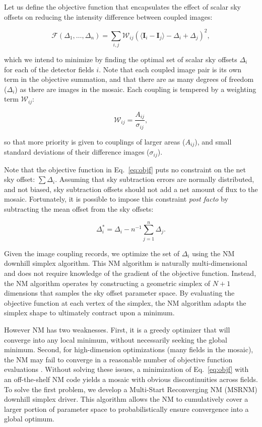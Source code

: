 \documentclass[iop]{emulateapj}
\newcommand{\vect}[1]{\boldsymbol{#1}} %
\newcommand{\Eq}[1]{Eq.~\ref{eq:#1}}  %
\begin{document}
Let us define the objective function that encapsulates the effect of scalar sky offsets on reducing the intensity difference between coupled images:

\begin{equation}
    \mathcal{F} \left(\Delta_1,\ldots,\Delta_n \right) = \sum_{i,j} \mathcal{W}_{ij} \left( \langle \vect{I}_i - \vect{I}_j \rangle - \Delta_i + \Delta_j \right)^2,
    \label{eq:objf}
\end{equation}

\noindent which we intend to minimize by finding the optimal set of scalar sky offsets $\Delta_i$ for each of the detector fields $i$.
Note that each coupled image pair is its own term in the objective summation, and that there are as many degrees of freedom ($\Delta_i$) as there are images in the mosaic.
Each coupling is tempered by a weighting term $\mathcal{W}_{ij}$:

\begin{equation}
    \mathcal{W}_{ij} = \frac{A_{ij}}{\sigma_{ij}},
\end{equation}

\noindent so that more priority is given to couplings of larger areas ($A_{ij}$), and small standard deviations of their difference images ($\sigma_{ij}$).

Note that the objective function in \Eq{objf} puts no constraint on the net sky offset: $\sum \Delta_i$.
Assuming that sky subtraction errors are normally distributed, and not biased, sky subtraction offsets should not add a net amount of flux to the mosaic.
Fortunately, it is possible to impose this constraint \textit{post facto} by subtracting the mean offset from the sky offsets:

\begin{equation}
    \Delta_i^* = \Delta_i - n^{-1}\sum_{j=1}^n \Delta_j.
    \label{eq:netzero}
\end{equation}

Given the image coupling records, we optimize the set of $\Delta_i$ using the NM downhill simplex algorithm.
This NM algorithm is naturally multi-dimensional and does not require knowledge of the gradient of the objective function.
Instead, the NM algorithm operates by constructing a geometric simplex of $N+1$ dimensions that samples the sky offset parameter space.
By evaluating the objective function at each vertex of the simplex, the NM algorithm adapts the simplex shape to ultimately contract upon a minimum.

However NM has two weaknesses.
First, it is a greedy optimizer that will converge into any local minimum, without necessarily seeking the global minimum.
Second, for high-dimension optimizations (many fields in the mosaic), the NM may fail to converge in a reasonable number of objective function evaluations \citep{Neumann:2006}.
Without solving these issues, a minimization of \Eq{objf} with an off-the-shelf NM code yields a mosaic with obvious discontinuities across fields.
To solve the first problem, we develop a Multi-Start Reconverging NM (MSRNM) downhill simplex driver.
This algorithm allows the NM to cumulatively cover a larger portion of parameter space to probabilistically ensure convergence into a global optimum.
\end{document}
